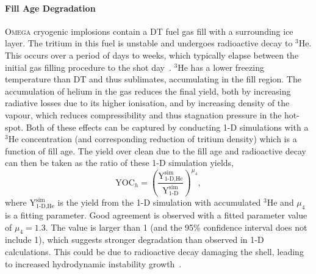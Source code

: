 \paragraph*{Fill Age Degradation}
\textsc{Omega} cryogenic implosions contain a DT fuel gas fill with a surrounding ice layer.
The tritium in this fuel is unstable and undergoes radioactive decay to ${}^{3}\text{He}$.
This occurs over a period of days to weeks, which typically elapse between the initial gas filling procedure to the shot day~\cite{regan_national_2019}.
${}^{3}\text{He}$ has a lower freezing temperature than DT and thus sublimates, accumulating in the fill region.
The accumulation of helium in the gas reduces the final yield, both by increasing radiative losses due to its higher ionisation, and by increasing density of the vapour, which reduces compressibility and thus stagnation pressure in the hot-spot.
Both of these effects can be captured by conducting 1-D simulations with a ${}^{3}\text{He}$ concentration (and corresponding reduction of tritium density) which is a function of fill age.
The yield over clean due to the fill age and radioactive decay can then be taken as the ratio of these 1-D simulation yields,
\begin{equation}
    \text{YOC}_h = \left( \frac{\text{Y}^{\text{sim}}_{1\text{-D,He}}}{\text{Y}^{\text{sim}}_{1\text{-D}}} \right)^{\mu_4},
\end{equation}
where $\text{Y}^{\text{sim}}_{1\text{-D,He}}$ is the yield from the 1-D simulation with accumulated ${}^{3}\text{He}$ and $\mu_4$ is a fitting parameter.
Good agreement is observed with a fitted parameter value of $\mu_4 = 1.3$.
The value is larger than 1 (and the 95\% confidence interval does not include 1), which suggests stronger degradation than observed in 1-D calculations.
This could be due to radioactive decay damaging the shell, leading to increased hydrodynamic instability growth~\cite{lees_understanding_2023}.

